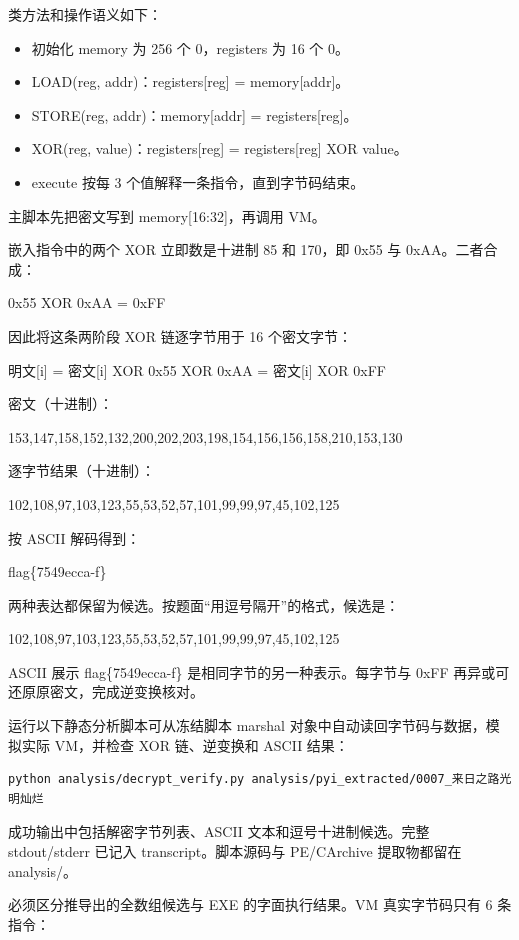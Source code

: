 类方法和操作语义如下：

\begin{itemize}
\tightlist
\item
  初始化 memory 为 256 个 0，registers 为 16 个 0。
\item
  LOAD(reg, addr)：registers{[}reg{]} = memory{[}addr{]}。
\item
  STORE(reg, addr)：memory{[}addr{]} = registers{[}reg{]}。
\item
  XOR(reg, value)：registers{[}reg{]} = registers{[}reg{]} XOR value。
\item
  execute 按每 3 个值解释一条指令，直到字节码结束。
\end{itemize}

主脚本先把密文写到 memory{[}16:32{]}，再调用 VM。

嵌入指令中的两个 XOR 立即数是十进制 85 和 170，即 0x55 与 0xAA。二者合成：

0x55 XOR 0xAA = 0xFF

因此将这条两阶段 XOR 链逐字节用于 16 个密文字节：

明文{[}i{]} = 密文{[}i{]} XOR 0x55 XOR 0xAA = 密文{[}i{]} XOR 0xFF

密文（十进制）：

153,147,158,152,132,200,202,203,198,154,156,156,158,210,153,130

逐字节结果（十进制）：

102,108,97,103,123,55,53,52,57,101,99,99,97,45,102,125

按 ASCII 解码得到：

flag\{7549ecca-f\}

两种表达都保留为候选。按题面``用逗号隔开''的格式，候选是：

102,108,97,103,123,55,53,52,57,101,99,99,97,45,102,125

ASCII 展示 flag\{7549ecca-f\} 是相同字节的另一种表示。每字节与 0xFF 再异或可还原原密文，完成逆变换核对。

运行以下静态分析脚本可从冻结脚本 marshal 对象中自动读回字节码与数据，模拟实际 VM，并检查 XOR 链、逆变换和 ASCII 结果：

\begin{verbatim}
python analysis/decrypt_verify.py analysis/pyi_extracted/0007_来日之路光明灿烂
\end{verbatim}

成功输出中包括解密字节列表、ASCII 文本和逗号十进制候选。完整 stdout/stderr 已记入 transcript。脚本源码与 PE/CArchive 提取物都留在 analysis/。

必须区分推导出的全数组候选与 EXE 的字面执行结果。VM 真实字节码只有 6 条指令：


